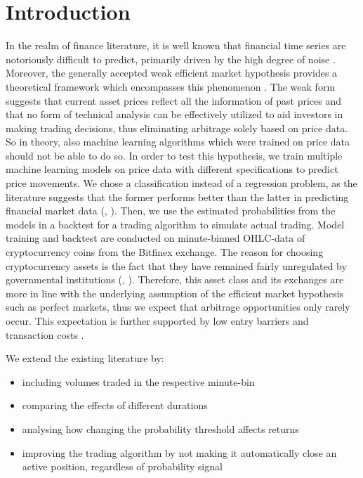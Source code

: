 \section{Introduction}
In the realm of finance literature, it is well known that financial time series
are notoriously difficult to predict, primarily driven by the high degree of noise \cite{fischer2017lstmMarketPrediction}.
Moreover, the generally accepted weak efficient market hypothesis provides a theoretical framework
which encompasses this phenomenon \cite{fama1970marketHypothesis}.
The weak form suggests that current asset prices reflect all the information of past prices 
and that no form of technical analysis can be effectively utilized to aid investors in making trading decisions,
thus eliminating arbitrage solely based on price data.
So in theory, also machine learning algorithms which were trained on price data 
should not be able to do so. 
In order to test this hypothesis, we train multiple machine learning models on price data with different
specifications to predict price movements. We chose a classification instead of a regression problem, as the literature
suggests that the former performs better than the latter in predicting financial market data
(\cite{leung2000classificationStockIndices}, \cite{enke2005classificationNN}).
Then, we use the estimated probabilities from the models in a backtest 
for a trading algorithm to simulate actual trading.
Model training and backtest are conducted on minute-binned OHLC-data of cryptocurrency coins from the 
Bitfinex exchange. The reason for choosing cryptocurrency assets is the fact that 
they have remained fairly unregulated by governmental institutions 
(\cite{dyhrberg2015bitcoinRegulations}, \cite{houben1994cryptoRegulation}).
Therefore, this asset class and its exchanges are more in line with the underlying assumption of the
efficient market hypothesis such as perfect markets, thus we expect that arbitrage opportunities only rarely occur. 
This expectation is further supported by low entry barriers and transaction costs \cite{bitfinex2012}.



We extend the existing literature by:

\begin{itemize}
    \item including volumes traded in the respective minute-bin
    \item comparing the effects of different durations
    \item analysing how changing the probability threshold affects returns
    \item improving the trading algorithm by not making it automatically close an active position, regardless of probability signal
\end{itemize}


